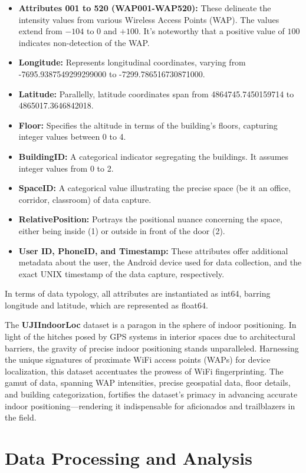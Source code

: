 \documentclass[conference]{IEEEtran}
\begin{document}
\begin{itemize}
\item \textbf{Attributes 001 to 520 (WAP001-WAP520):} These delineate the intensity values from various Wireless Access Points (WAP). The values extend from $-104$ to $0$ and $+100$. It's noteworthy that a positive value of $100$ indicates non-detection of the WAP.
\item \textbf{Longitude:} Represents longitudinal coordinates, varying from -7695.9387549299299000 to -7299.786516730871000.
\item \textbf{Latitude:} Parallelly, latitude coordinates span from 4864745.7450159714 to 4865017.3646842018.
\item \textbf{Floor:} Specifies the altitude in terms of the building's floors, capturing integer values between 0 to 4.
\item \textbf{BuildingID:} A categorical indicator segregating the buildings. It assumes integer values from 0 to 2.
\item \textbf{SpaceID:} A categorical value illustrating the precise space (be it an office, corridor, classroom) of data capture.
\item \textbf{RelativePosition:} Portrays the positional nuance concerning the space, either being inside (1) or outside in front of the door (2).
\item \textbf{User ID, PhoneID, and Timestamp:} These attributes offer additional metadata about the user, the Android device used for data collection, and the exact UNIX timestamp of the data capture, respectively.
\end{itemize}

In terms of data typology, all attributes are instantiated as int64, barring longitude and latitude, which are represented as float64.

The \textbf{UJIIndoorLoc} dataset is a paragon in the sphere of indoor positioning. In light of the hitches posed by GPS systems in interior spaces due to architectural barriers, the gravity of precise indoor positioning stands unparalleled. Harnessing the unique signatures of proximate WiFi access points (WAPs) for device localization, this dataset accentuates the prowess of WiFi fingerprinting. The gamut of data, spanning WAP intensities, precise geospatial data, floor details, and building categorization, fortifies the dataset's primacy in advancing accurate indoor positioning—rendering it indispensable for aficionados and trailblazers in the field.

\section{Data Processing and Analysis}
\end{document}
